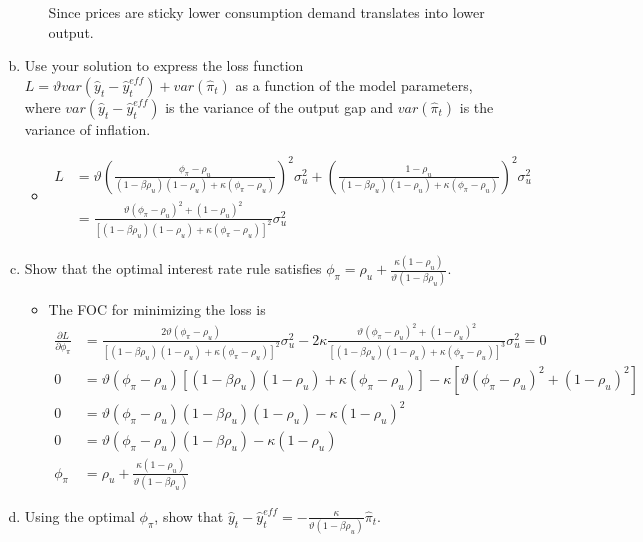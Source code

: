 \documentclass{article}
\newcommand{\1}{\mathbf{1}}
\begin{document}
\begin{enumerate}[(a)]
\begin{itemize}
	Since prices are sticky lower consumption demand translates into lower output.
\end{itemize}
\item Use your solution to express the loss function $L=\vartheta var(\hat{y}_{t}-\hat{y}_{t}^{eff})+var(\hat{\pi}_t)$ as a function of the model parameters, where $var(\hat{y}_{t}-\hat{y}_{t}^{eff})$ is the variance of the output gap and $var(\hat{\pi}_t)$ is the variance of inflation.
\begin{itemize}
	\item \begin{align*}
	L &= \vartheta \left(\frac{\phi_\pi-\rho_u}{(1-\beta\rho_u)(1-\rho_u) +\kappa(\phi_\pi-\rho_u)}\right)^2 \sigma_u^2 + \left(\frac{1-\rho_u}{(1-\beta\rho_u)(1-\rho_u) +\kappa(\phi_\pi-\rho_u)}\right)^2 \sigma_u^2 \\
	&= \frac{\vartheta(\phi_\pi-\rho_u)^2 + (1-\rho_u)^2}{[(1-\beta\rho_u)(1-\rho_u) +\kappa(\phi_\pi-\rho_u)]^2} \sigma_u^2
\end{align*}
\end{itemize}
\item Show that the optimal interest rate rule satisfies $\phi_\pi=\rho_u + \frac{\kappa (1-\rho_u)}{\vartheta(1-\beta\rho_u)}$.
\begin{itemize}
	\item The FOC for minimizing the loss is
	\begin{align*}
	\frac{\partial L}{\partial \phi_\pi} &= \frac{2\vartheta(\phi_\pi-\rho_u) }{[(1-\beta\rho_u)(1-\rho_u) +\kappa(\phi_\pi-\rho_u)]^2} \sigma_u^2 - 2\kappa\frac{\vartheta(\phi_\pi-\rho_u)^2 + (1-\rho_u)^2}{[(1-\beta\rho_u)(1-\rho_u) +\kappa(\phi_\pi-\rho_u)]^3} \sigma_u^2 = 0 \\
	0&= \vartheta(\phi_\pi-\rho_u)[(1-\beta\rho_u)(1-\rho_u) +\kappa(\phi_\pi-\rho_u)]  - \kappa[\vartheta(\phi_\pi-\rho_u)^2 + (1-\rho_u)^2] \\
	0&= \vartheta(\phi_\pi-\rho_u)(1-\beta\rho_u)(1-\rho_u)   - \kappa (1-\rho_u)^2 \\
	0&= \vartheta(\phi_\pi-\rho_u)(1-\beta\rho_u)   - \kappa (1-\rho_u) \\
	\phi_\pi&=\rho_u + \frac{\kappa (1-\rho_u)}{\vartheta(1-\beta\rho_u)}
\end{align*}
\end{itemize}
\item Using the optimal $\phi_\pi$, show that $\hat{y}_{t}-\hat{y}_{t}^{eff}=-\frac{\kappa}{\vartheta(1-\beta\rho_u)}\hat{\pi}_t$.
\begin{itemize}

\end{itemize}
\end{enumerate}
\end{document}
